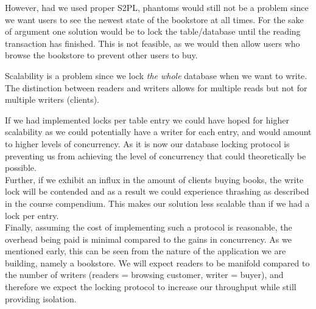 \documentclass[11pt]{article}
\begin{document}
However, had we used proper S2PL, phantoms would still not be a problem since
we want users to see the newest state of the bookstore at all times.
For the sake of argument one solution would be to lock the table/database
until the reading transaction has finished. This is not feasible, as we would
then allow users who browse the bookstore to prevent other users to buy.  


Scalability is a problem since we lock \emph{the whole} database when we
want to write. The distinction between readers and writers
allows for multiple reads but not for multiple writers (clients).

If we had implemented locks per table entry we could have
hoped for higher scalability as we could potentially have a writer for each
entry, and would amount to higher levels of concurrency. As it is now
our database locking protocol is preventing us from achieving
the level of concurrency that could theoretically be possible.\\

Further, if we exhibit an influx in the amount of clients buying books,
the write lock will be contended and as a result we could experience
thrashing as described in the course compendium. This makes our
solution less scalable than if we had a lock per entry.\\

Finally, assuming the cost of implementing such a protocol is reasonable, the
overhead being paid is minimal compared to the gains in concurrency.
As we mentioned early, this can be seen from the nature of the application
we are building, namely a bookstore. We will expect readers to be manifold
compared to the number of writers (readers = browsing customer, writer = 
buyer), and therefore we expect the locking protocol to increase our 
throughput while still providing isolation.
\end{document}
